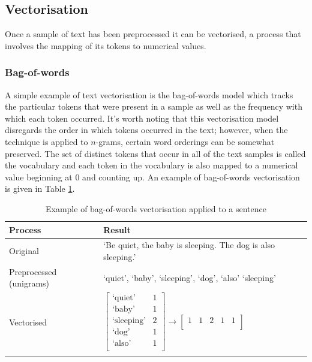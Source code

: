 \subsection{Vectorisation}

Once a sample of text has been preprocessed it can be vectorised, a process that involves the mapping of its tokens to numerical values.

\subsubsection{Bag-of-words}

A simple example of text vectorisation is the bag-of-words model which tracks the particular tokens that were present in a sample as well as the frequency with which each token occurred. It's worth noting that this vectorisation model disregards the order in which tokens occurred in the text; however, when the technique is applied to $n$-grams, certain word orderings can be somewhat preserved. The set of distinct tokens that occur in all of the text samples is called the vocabulary and each token in the vocabulary is also mapped to a numerical value beginning at 0 and counting up. An example of bag-of-words vectorisation is given in Table \ref{tab:Explain_BOW}.

\begin{table}[ht]
    \centering
    \begin{tabular}{l l}
        \toprule
        \textbf{Process} & \textbf{Result} \\\midrule
        Original & `Be quiet, the baby is sleeping. The dog is also sleeping.'\\
        Preprocessed (unigrams) & `quiet', `baby', `sleeping', `dog', `also' `sleeping'\\
        Vectorised & $\begin{bmatrix} \text{`quiet'} & 1\\ \text{`baby'} & 1\\ \text{`sleeping'} & 2\\ \text{`dog'} & 1\\ \text{`also'} & 1\\ \end{bmatrix} \longrightarrow \begin{bmatrix} 1&1&2&1&1\\ \end{bmatrix}$\\
        \bottomrule\\
    \end{tabular}
    \caption{Example of bag-of-words vectorisation applied to a sentence}
    \label{tab:Explain_BOW}
\end{table}

